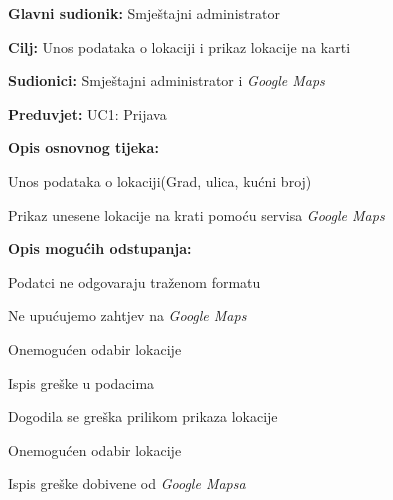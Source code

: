 					\noindent {}
					\begin{packed_item}
						
						\item \textbf{Glavni sudionik: }Smještajni administrator
						\item  \textbf{Cilj:} Unos podataka o lokaciji i prikaz lokacije na karti
						\item  \textbf{Sudionici:} Smještajni administrator i \textit{Google Maps}
						\item  \textbf{Preduvjet:} UC1: Prijava
						\item  \textbf{Opis osnovnog tijeka:}
						
						\item[] \begin{packed_enum}
							
							\item Unos podataka o lokaciji(Grad, ulica, kućni broj)
							\item Prikaz unesene lokacije na krati pomoću servisa \textit{Google Maps}
							
						\end{packed_enum}
						
						\item  \textbf{Opis mogućih odstupanja:}
						
						\item[] \begin{packed_item}
							
							\item[1.a] Podatci ne odgovaraju traženom formatu
							\item[] \begin{packed_enum}
								
								\item Ne upućujemo zahtjev na \textit{Google Maps}
								\item Onemogućen odabir lokacije
								\item Ispis greške u podacima
								
							\end{packed_enum}
							
							\item[2.a] Dogodila se greška prilikom prikaza lokacije
							\item[] \begin{packed_enum}
								
								\item Onemogućen odabir lokacije
								\item Ispis greške dobivene od \textit{Google Mapsa}
								
							\end{packed_enum}
							
						\end{packed_item}
					\end{packed_item}
					
